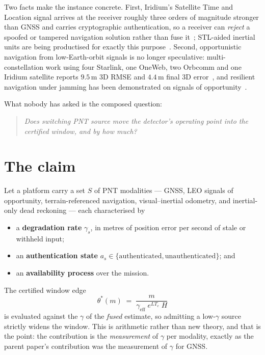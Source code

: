 \documentclass[11pt,a4paper]{article}
\begin{document}
Two facts make the instance concrete. First, Iridium's Satellite Time and
Location signal arrives at the receiver roughly three orders of magnitude
stronger than GNSS and carries cryptographic authentication, so a receiver can
\emph{reject} a spoofed or tampered navigation solution rather than fuse
it~\cite{insidegnss_iridium,groundcontrol_apnt}; STL-aided inertial units are
being productised for exactly this
purpose~\cite{nal_vectornav_stl}. Second, opportunistic navigation from
low-Earth-orbit signals is no longer speculative: multi-constellation work using
four Starlink, one OneWeb, two Orbcomm and one Iridium satellite reports
$9.5$\,m 3D RMSE and $4.4$\,m final 3D
error~\cite{insidegnss_multiconstellation,kassas2021leodoppler}, and
resilient navigation under jamming has been demonstrated on signals of
opportunity~\cite{kassas2022jammer}.

What nobody has asked is the composed question:

\begin{quote}
\itshape
Does switching PNT source move the detector's operating point into the certified
window, and by how much?
\end{quote}

\section{The claim}
Let a platform carry a set $S$ of PNT modalities --- GNSS, LEO signals of
opportunity, terrain-referenced navigation, visual--inertial odometry, and
inertial-only dead reckoning --- each characterised by

\begin{itemize}
\item a \textbf{degradation rate} $\gamma_s$, in metres of position error per
      second of stale or withheld input;
\item an \textbf{authentication state}
      $a_s\in\{\text{authenticated},\text{unauthenticated}\}$; and
\item an \textbf{availability process} over the mission.
\end{itemize}

\begin{claim}
\label{cl:vector}
The certified window edge
\begin{equation}
\label{eq:window}
\theta^{*}(m) \;=\; \frac{m}{\gamma_{\mathrm{eff}}\; e^{L T_c}\; H}
\end{equation}
is evaluated against the $\gamma$ of the \emph{fused} estimate, so admitting a
low-$\gamma$ source strictly widens the window. This is arithmetic rather than
new theory, and that is the point: the contribution is the \emph{measurement} of
$\gamma$ per modality, exactly as the parent paper's contribution was the
measurement of $\gamma$ for GNSS.
\end{claim}
\end{document}
